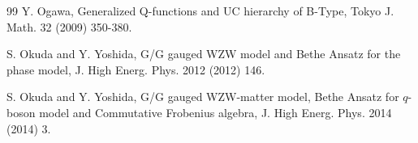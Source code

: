 \documentclass[11pt,reqno]{amsart}
\numberwithin{equation}{section}
\begin{document}
\begin{thebibliography}{99}
		Y. Ogawa, Generalized Q-functions and UC hierarchy of B-Type, Tokyo J. Math. 32 (2009) 350-380.
		
		S. Okuda and Y. Yoshida, G/G gauged WZW model and Bethe Ansatz for the phase model, J. High Energ. Phys. 2012 (2012) 146.
		
		S. Okuda and Y. Yoshida, G/G gauged WZW-matter model, Bethe Ansatz for $q$-boson model and Commutative Frobenius algebra, J. High Energ. Phys. 2014  (2014) 3.
		
		
	\end{thebibliography}
\end{document}

